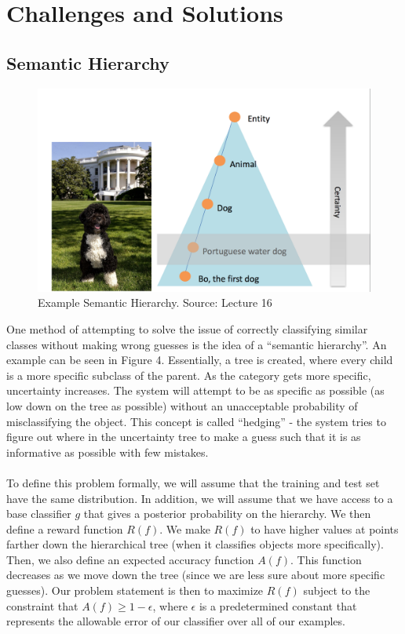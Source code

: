 \documentclass[11pt]{article}
\begin{document}
\section{Challenges and Solutions}
\subsection{Semantic Hierarchy}
\begin{figure}[h]
  \centering
  \includegraphics[scale=0.6]{bo.png}
  \caption{Example Semantic Hierarchy. Source: Lecture 16}
\end{figure}
One method of attempting to solve the issue of correctly classifying similar classes without making wrong guesses is the idea of a ``semantic hierarchy''. An example can be seen in Figure 4. Essentially, a tree is created, where every child is a more specific subclass of the parent. As the category gets more specific, uncertainty increases. The system will attempt to be as specific as possible (as low down on the tree as possible) without an unacceptable probability of misclassifying the object. This concept is called ``hedging'' - the system tries to figure out where in the uncertainty tree to make a guess such that it is as informative as possible with few mistakes.\\ \\ 
To define this problem formally, we will assume that the training and test set have the same distribution. In addition, we will assume that we have access to a base classifier $g$ that gives a posterior probability on the hierarchy. We then define a reward function $R(f)$. We make $R(f)$ to have higher values at points farther down the hierarchical tree (when it classifies objects more specifically). Then, we also define an expected accuracy function $A(f)$. This function decreases as we move down the tree (since we are less sure about more specific guesses). Our problem statement is then to maximize $R(f)$ subject to the constraint that $A(f) \ge 1 - \epsilon$, where $\epsilon$ is a predetermined constant that represents the allowable error of our classifier over all of our examples.\\ \\
\end{document}
